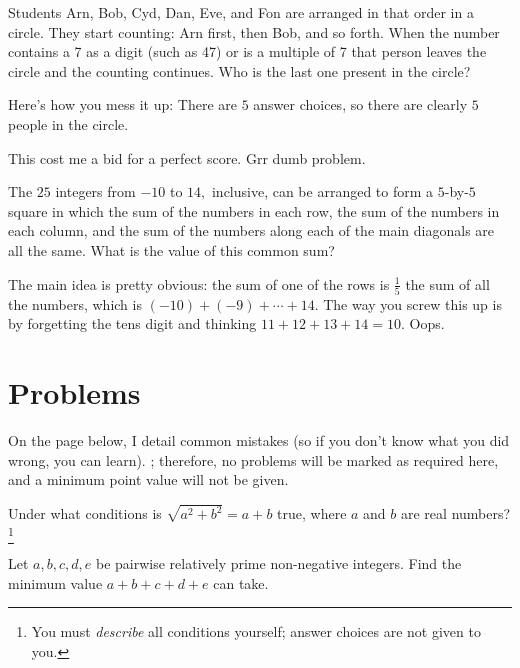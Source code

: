 \documentclass{article}
\begin{document}
\begin{exam}[AMC 8 2018/3]
Students Arn, Bob, Cyd, Dan, Eve, and Fon are arranged in that order in a circle. They start counting: Arn first, then Bob, and so forth. When the number contains a 7 as a digit (such as 47) or is a multiple of 7 that person leaves the circle and the counting continues. Who is the last one present in the circle?
\end{exam}

Here's how you mess it up: There are $5$ answer choices, so there are clearly $5$ people in the circle.

This cost me a bid for a perfect score. Grr dumb problem.

\begin{exam}[AMC 10A 2020/7]
The $25$ integers from $-10$ to $14,$ inclusive, can be arranged to form a $5$-by-$5$ square in which the sum of the numbers in each row, the sum of the numbers in each column, and the sum of the numbers along each of the main diagonals are all the same. What is the value of this common sum?
\end{exam}

The main idea is pretty obvious: the sum of one of the rows is $\frac{1}{5}$ the sum of all the numbers, which is $(-10)+(-9)+\cdots+14.$ The way you screw this up is by forgetting the tens digit and thinking $11+12+13+14=10.$ Oops.

\pagebreak

\section{Problems}

On the page below, I detail common mistakes (so if you don't know what you did wrong, you can learn). ; therefore, no problems will be marked as required here, and a minimum point value will not be given.


\begin{prob}[AMC 12A 2021/2]{2}
Under what conditions is $\sqrt{a^2+b^2}=a+b$ true, where $a$ and $b$ are real numbers?\footnote{You must \textit{describe} all conditions yourself; answer choices are not given to you.}
\end{prob}

\begin{prob}{2}
Let $a,b,c,d,e$ be pairwise relatively prime non-negative integers. Find the minimum value $a+b+c+d+e$ can take.
\end{prob}
\end{document}
